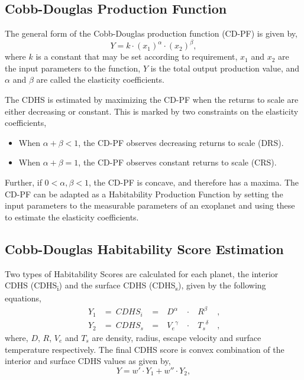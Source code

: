 \documentclass{article}
\begin{document}
\subsection{Cobb-Douglas Production Function}
The general form of the Cobb-Douglas production function (CD-PF) is given by,
\begin{equation}
  Y = k\cdot{(x_1)}^\alpha\cdot{(x_2)}^\beta,
\end{equation}
where $k$ is a constant that may be set according to requirement, $x_1$ and $x_2$ are the input parameters to the
function, $Y$ is the total output production value, and $\alpha$ and $\beta$ are called the elasticity coefficients.

The CDHS is estimated by maximizing the CD-PF when the returns to scale are either decreasing or constant. This is
marked by two constraints on the elasticity coefficients,
\begin{itemize}
\setlength\itemsep{0pt}
\item When $\alpha+\beta < 1$, the CD-PF observes decreasing returns to scale (DRS).
\item When $\alpha+\beta = 1$, the CD-PF observes constant returns to scale (CRS).
\end{itemize}
Further, if $0 < \alpha, \beta < 1$, the CD-PF is concave, and therefore has a maxima. The CD-PF can be adapted as a
Habitability Production Function by setting the input parameters to the measurable parameters of an exoplanet and using
these to estimate the elasticity coefficients.

\subsection{Cobb-Douglas Habitability Score Estimation}
Two types of Habitability Scores are calculated for each planet, the interior CDHS (CDHS\textsubscript{i}) and the
surface CDHS (CDHS\textsubscript{s}), given by the following equations,
\begin{subequations}
  \begin{alignat}{4}
    Y_1 &=\ {CDHS}_i\ &=\ &D^\alpha\ & \cdot\ &R^\beta\ &,\\
    Y_2 &=\ {CDHS}_s\ &=\ &{V_e}^\gamma\ & \cdot\ &{T_s}^\delta\ &,
  \end{alignat}
\end{subequations}
where, $D$, $R$, $V_e$ and $T_s$ are density, radius, escape velocity and surface temperature respectively. The final
CDHS score is convex combination of the interior and surface CDHS values as given by,
\begin{equation}
  Y = w'\cdot Y_1 + w''\cdot Y_2,
\end{equation}
\end{document}
